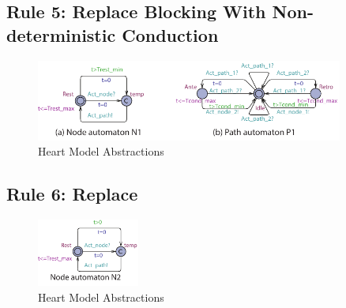 \subsection{Rule 5: Replace Blocking With Non-deterministic Conduction}

\begin{figure}[!h]
		\centering
		\includegraphics[width=0.9\textwidth]{figs/rule5.pdf}
		\caption{\small Heart Model Abstractions}
		\label{fig:rule5}
\end{figure}
\subsection{Rule 6: Replace}

\begin{figure}[!h]
		\centering
		\includegraphics[width=0.3\textwidth]{figs/rule6.pdf}
		\caption{\small Heart Model Abstractions}
		\label{fig:rule6}
\end{figure}
